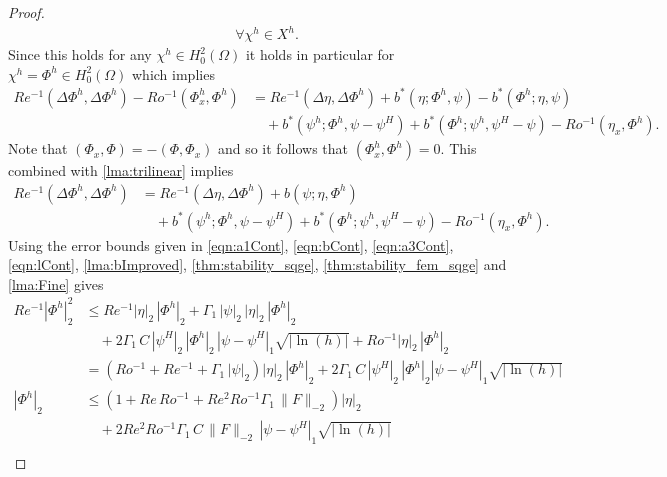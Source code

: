 \begin{proof}
\begin{equation*}
\begin{split}
      \quad \forall \chi^h \in X^h.
    \end{split}
  \end{equation*}
  Since this holds for any $\chi^h\in H^2_0(\Omega)$ it holds in particular for
  $\chi^h=\Phi^h\in H^2_0(\Omega)$ which implies
  \begin{equation*}
    \begin{split}
      Re^{-1} (\Delta \Phi^h, \Delta \Phi^h) - Ro^{-1} (\Phi^h_x,\Phi^h)
        &= Re^{-1} (\Delta \eta, \Delta \Phi^h)
        + b^*(\eta;\Phi^h, \psi) - b^*(\Phi^h;\eta,\psi) \\
      &\quad+ b^*(\psi^h;\Phi^h,\psi-\psi^H) + b^*(\Phi^h; \psi^h,\psi^H-\psi)
        - Ro^{-1} (\eta_x,\Phi^h).
    \end{split}
  \end{equation*}
  Note that $(\Phi_x,\Phi) = -(\Phi,\Phi_x)$ and so it follows that
  $(\Phi^h_x,\Phi^h) = 0$. This combined with \autoref{lma:trilinear} implies
  \begin{equation*}
    \begin{split}
      Re^{-1} (\Delta \Phi^h, \Delta \Phi^h) &= Re^{-1} (\Delta \eta, \Delta \Phi^h)
        + b(\psi;\eta,\Phi^h) \\
      &\quad+ b^*(\psi^h;\Phi^h,\psi-\psi^H) + b^*(\Phi^h; \psi^h,\psi^H-\psi)
        - Ro^{-1} (\eta_x,\Phi^h).
    \end{split}
  \end{equation*}
  Using the error bounds given in \eqref{eqn:a1Cont}, \eqref{eqn:bCont},
  \eqref{eqn:a3Cont}, \eqref{eqn:lCont}, \autoref{lma:bImproved},
  \autoref{thm:stability_sqge}, \autoref{thm:stability_fem_sqge} and
  \autoref{lma:Fine} gives
  \begin{align*}
    Re^{-1} |\Phi^h|_2^2 &\le Re^{-1} |\eta|_2\, |\Phi^h|_2 + \Gamma_1\, |\psi|_2\, |\eta|_2\, |\Phi^h|_2 \\
      &\quad+ 2 \Gamma_1\, C\, |\psi^H|_2\, |\Phi^h|_2\, |\psi - \psi^H|_1 \sqrt{|\ln(h)|} + Ro^{-1}
        |\eta|_2\, |\Phi^h|_2 \\
    &= \left(Ro^{-1} + Re^{-1} + \Gamma_1\, |\psi|_2\right) |\eta|_2\, |\Phi^h|_2 + 2 \Gamma_1\, C\,
      |\psi^H|_2\, |\Phi^h|_2 |\psi - \psi^H|_1 \sqrt{|\ln(h)|}  \\
    |\Phi^h|_2 &\le \left(1 + Re\, Ro^{-1} + Re^2 Ro^{-1} \Gamma_1\, \|F\|_{-2}\right) |\eta|_2 \\
      &\quad + 2 Re^2 Ro^{-1} \Gamma_1\, C\, \|F\|_{-2}\, |\psi - \psi^H|_1 \sqrt{|\ln(h)|} \\
  \end{align*}

\end{proof}
